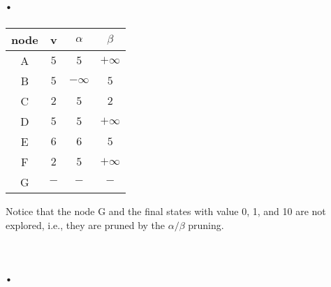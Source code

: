 \documentclass[12pt]{article}
\newcommand{\RN}[1]{%
  \textup{\uppercase\expandafter{\romannumeral#1}}%
}
\begin{document}
\section*{\RN{2}.}
\begin{table}[H]
\centering
\label{my-label1}
\begin{tabular}{|c|c|c|c|}
\hline
node & v & $\alpha$ & $\beta$\\ \hline
A & $5$ & $5$ & $+\infty$\\ \hline
B & $5$ & $-\infty$ & $5$\\ \hline
C & $2$  & $5$ & $2$\\ \hline
D & $5$ & $5$ & $+\infty$\\ \hline
E & $6$ & $6$ & $5$\\ \hline
F & $2$ & $5$ & $+\infty$\\ \hline
G & $-$ & $-$ & $-$\\ \hline
\end{tabular}
\end{table}

Notice that the node G and the final states with value 0, 1, and 10 are not explored, i.e., they are pruned by the $\alpha/\beta$ pruning.



\section*{\RN{3}.}
\end{document}
